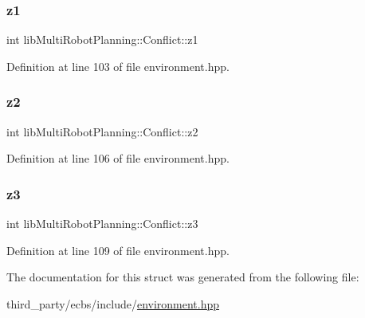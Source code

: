 \subsubsection{\texorpdfstring{z1}{z1}}
{\footnotesize\ttfamily int lib\+Multi\+Robot\+Planning\+::\+Conflict\+::z1}



Definition at line 103 of file environment.\+hpp.

\mbox{\label{structlib_multi_robot_planning_1_1_conflict_a435f1f9f9b274d51133d137985761289}} 
\subsubsection{\texorpdfstring{z2}{z2}}
{\footnotesize\ttfamily int lib\+Multi\+Robot\+Planning\+::\+Conflict\+::z2}



Definition at line 106 of file environment.\+hpp.

\mbox{\label{structlib_multi_robot_planning_1_1_conflict_a0704de0fe48fcb194b46fc9fd0fcac3b}} 
\subsubsection{\texorpdfstring{z3}{z3}}
{\footnotesize\ttfamily int lib\+Multi\+Robot\+Planning\+::\+Conflict\+::z3}



Definition at line 109 of file environment.\+hpp.



The documentation for this struct was generated from the following file\+:\begin{DoxyCompactItemize}
\item 
third\+\_\+party/ecbs/include/\hyperlink{environment_8hpp}{environment.\+hpp}\end{DoxyCompactItemize}
